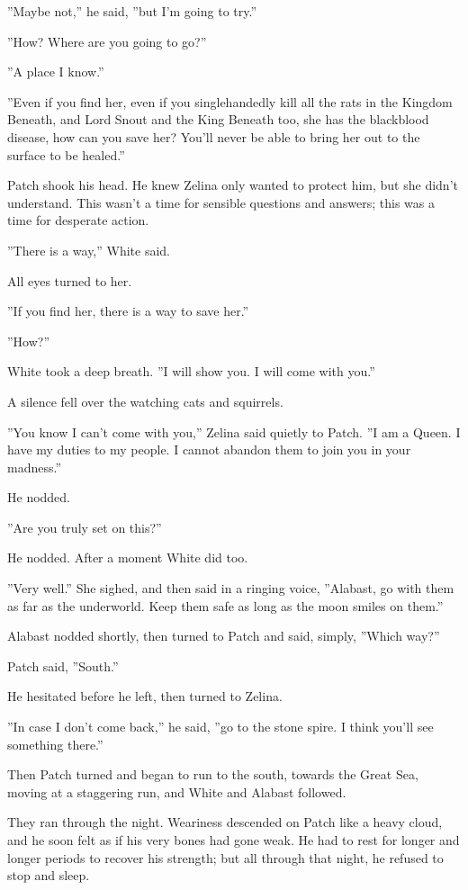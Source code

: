 \documentclass[12pt]{book}
\begin{document}
''Maybe not,'' he said, ''but I'm going to try.''

''How? Where are you going to go?''

''A place I know.''

''Even if you find her, even if you singlehandedly kill all the rats
in the Kingdom Beneath, and Lord Snout and the King Beneath too, she
has the blackblood disease, how can you save her? You'll never be able
to bring her out to the surface to be healed.''

Patch shook his head. He knew Zelina only wanted to protect him, but
she didn't understand. This wasn't a time for sensible questions and
answers; this was a time for desperate action.

''There is a way,'' White said.

All eyes turned to her.

''If you find her, there is a way to save her.''

''How?''

White took a deep breath. ''I will show you. I will come with you.''

A silence fell over the watching cats and squirrels.

''You know I can't come with you,'' Zelina said quietly to Patch. ''I
am a Queen. I have my duties to my people. I cannot abandon them to
join you in your madness.''

He nodded.

''Are you truly set on this?''

He nodded. After a moment White did too.

''Very well.'' She sighed, and then said in a ringing voice,
''Alabast, go with them as far as the underworld. Keep them safe as
long as the moon smiles on them.''

Alabast nodded shortly, then turned to Patch and said, simply, ''Which
way?''

Patch said, ''South.''

He hesitated before he left, then turned to Zelina.

''In case I don't come back,'' he said, ''go to the stone spire. I
think you'll see something there.''

Then Patch turned and began to run to the south, towards the Great
Sea, moving at a staggering run, and White and Alabast followed.

They ran through the night. Weariness descended on Patch like a heavy
cloud, and he soon felt as if his very bones had gone weak. He had to
rest for longer and longer periods to recover his strength; but all
through that night, he refused to stop and sleep.
\end{document}
